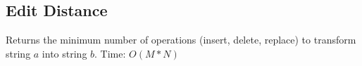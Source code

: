 \subsection{Edit Distance}

Returns the minimum number of operations (insert, delete, replace) to transform string $a$ into string $b$.
Time: $O(M * N)$